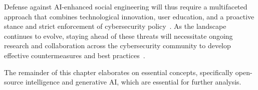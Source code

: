%
%
Defense against AI-enhanced social engineering will thus require a multifaceted approach that combines technological innovation, user education, and a proactive stance and strict enforcement of cybersecurity policy~\citep{blauth_AI_Crime_Overview_Malicious_Use_Abuse_2022}. As the landscape continues to evolve, staying ahead of these threats will necessitate ongoing research and collaboration across the cybersecurity community to develop effective countermeasures and best practices~\citep{fakhouri_AI_Driven_Solutions_SE_Attacks_2024}.







The remainder of this chapter elaborates on essential concepts, specifically open-source intelligence and generative AI, which are essential for further analysis.












